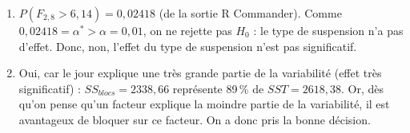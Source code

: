 \begin{exercice}
\begin{solution}
\begin{enumerate}[label=(\alph*)]
\begin{align*}
    \text{EEEEE}&=\frac{MSB}{MSE}=\frac{2338,66/4}{110,31/8}=42,40
  \end{align*}
  \item $P(F_{2,8}>6,14)=0,02418$ (de la sortie R Commander). Comme
  $0,02418=\alpha^*>\alpha=0,01$, on ne rejette pas $H_0$ : le type de suspension n'a pas
  d'effet. Donc, non, l'effet du type de suspension n'est pas significatif.
  \item Oui, car le jour explique une très grande partie de la variabilité (effet très
  significatif) : $SS_{blocs}=2338,66$ représente 89\,\% de $SST=2618,38$. Or, dès qu'on
  pense qu'un facteur explique la moindre partie de la variabilité, il est avantageux de
  \og bloquer \fg{} sur ce facteur. On a donc pris la bonne décision.
\end{enumerate}
\end{solution}
\end{exercice}

